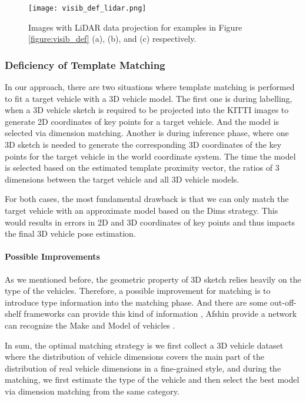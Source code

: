 \begin{figure}[H]		
	\texttt{[image: visib\_def\_lidar.png]}
	\caption{Images with LiDAR data projection for examples in Figure \ref{figure:visib_def} (a), (b), and (c) respectively.}
	\centering
	\label{figure:visib_def_lidar}
\end{figure}

\subsubsection{Deficiency of Template Matching}
In our approach, there are two situations where template matching is performed to fit a target vehicle with a 3D vehicle model. The first one is during labelling, when a 3D vehicle sketch is required to be projected into the KITTI images to generate 2D coordinates of key points for a target vehicle. And the model is selected via dimension matching. Another is during inference phase, where one 3D sketch is needed to generate the corresponding 3D coordinates of the key points for the target vehicle in the world coordinate system. The time the model is selected based on the estimated template proximity vector, \ie the ratios of 3 dimensions between the target vehicle and all 3D vehicle models.

For both cases, the most fundamental drawback is that we can only match the target vehicle with an approximate model based on the Dims strategy. This would results in errors in 2D and 3D coordinates of key points and thus impacts the final 3D vehicle pose estimation.

\paragraph{Possible Improvements}
As we mentioned before, the geometric property of 3D sketch relies heavily on the type of the vehicles. Therefore, a possible improvement for matching is to introduce type information into the matching phase. And there are some out-off-shelf frameworks can provide this kind of information \cite{DBLP:journals/corr/YangLLT15, 7780697, 7410527, DBLP:journals/corr/DehghanMSO17}, \ie Afshin \etal provide a network can recognize the Make and Model of vehicles \cite{DBLP:journals/corr/DehghanMSO17}. 

In sum, the optimal matching strategy is we first collect a 3D vehicle dataset where the distribution of vehicle dimensions covers the main part of the distribution of real vehicle dimensions in a fine-grained style, and during the matching, we first estimate the type of the vehicle and then select the best model via dimension matching from the same category. 

